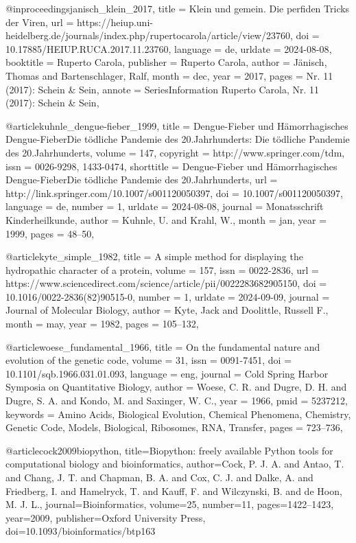 \documentclass[german,version-2022-01]{uzl-thesis}
\begin{document}
\begin{bibtex-entries}
@inproceedings{janisch_klein_2017,
	title = {Klein und gemein. {Die} perfiden {Tricks} der {Viren}},
	url = {https://heiup.uni-heidelberg.de/journals/index.php/rupertocarola/article/view/23760},
	doi = {10.17885/HEIUP.RUCA.2017.11.23760},
	language = {de},
	urldate = {2024-08-08},
	booktitle = {Ruperto {Carola}},
	publisher = {Ruperto Carola},
	author = {J\"anisch, Thomas and Bartenschlager, Ralf},
	month = dec,
	year = {2017},
	pages = {Nr. 11 (2017): Schein \& Sein},
	annote = {SeriesInformation
Ruperto Carola, Nr. 11 (2017): Schein \& Sein},
}

@article{kuhnle_dengue-fieber_1999,
	title = {Dengue-{Fieber} und {H\"amorrhagisches} {Dengue}-{FieberDie} t\"odliche {Pandemie} des 20.{Jahrhunderts}: {Die} t\"odliche {Pandemie} des 20.{Jahrhunderts}},
	volume = {147},
	copyright = {http://www.springer.com/tdm},
	issn = {0026-9298, 1433-0474},
	shorttitle = {Dengue-{Fieber} und {H\"amorrhagisches} {Dengue}-{FieberDie} t\"odliche {Pandemie} des 20.{Jahrhunderts}},
	url = {http://link.springer.com/10.1007/s001120050397},
	doi = {10.1007/s001120050397},
	language = {de},
	number = {1},
	urldate = {2024-08-08},
	journal = {Monatsschrift Kinderheilkunde},
	author = {Kuhnle, U. and Krahl, W.},
	month = jan,
	year = {1999},
	pages = {48--50},
}

@article{kyte_simple_1982,
	title = {A simple method for displaying the hydropathic character of a protein},
	volume = {157},
	issn = {0022-2836},
	url = {https://www.sciencedirect.com/science/article/pii/0022283682905150},
	doi = {10.1016/0022-2836(82)90515-0},
	number = {1},
	urldate = {2024-09-09},
	journal = {Journal of Molecular Biology},
	author = {Kyte, Jack and Doolittle, Russell F.},
	month = may,
	year = {1982},
	pages = {105--132},
}

@article{woese_fundamental_1966,
	title = {On the fundamental nature and evolution of the genetic code},
	volume = {31},
	issn = {0091-7451},
	doi = {10.1101/sqb.1966.031.01.093},
	language = {eng},
	journal = {Cold Spring Harbor Symposia on Quantitative Biology},
	author = {Woese, C. R. and Dugre, D. H. and Dugre, S. A. and Kondo, M. and Saxinger, W. C.},
	year = {1966},
	pmid = {5237212},
	keywords = {Amino Acids, Biological Evolution, Chemical Phenomena, Chemistry, Genetic Code, Models, Biological, Ribosomes, RNA, Transfer},
	pages = {723--736},
}

@article{cock2009biopython,
  title={Biopython: freely available Python tools for computational biology and bioinformatics},
  author={Cock, P. J. A. and Antao, T. and Chang, J. T. and Chapman, B. A. and Cox, C. J. and Dalke, A. and Friedberg, I. and Hamelryck, T. and Kauff, F. and Wilczynski, B. and de Hoon, M. J. L.},
  journal={Bioinformatics},
  volume={25},
  number={11},
  pages={1422--1423},
  year={2009},
  publisher={Oxford University Press},
  doi={10.1093/bioinformatics/btp163}
}


\end{bibtex-entries}
\end{document}
